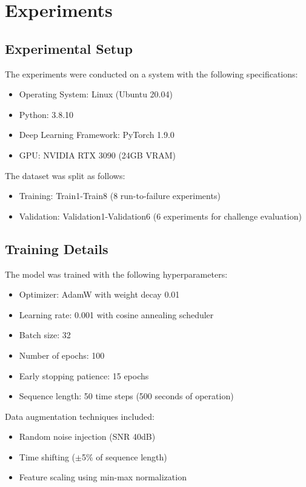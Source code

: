 \documentclass[conference,twocolumn]{IEEEtran}
\begin{document}
\section{Experiments}

\subsection{Experimental Setup}

The experiments were conducted on a system with the following specifications:
\begin{itemize}
    \item Operating System: Linux (Ubuntu 20.04)
    \item Python: 3.8.10
    \item Deep Learning Framework: PyTorch 1.9.0
    \item GPU: NVIDIA RTX 3090 (24GB VRAM)
\end{itemize}

The dataset was split as follows:
\begin{itemize}
    \item Training: Train1-Train8 (8 run-to-failure experiments)
    \item Validation: Validation1-Validation6 (6 experiments for challenge evaluation)
\end{itemize}

\subsection{Training Details}

The model was trained with the following hyperparameters:
\begin{itemize}
    \item Optimizer: AdamW with weight decay 0.01
    \item Learning rate: 0.001 with cosine annealing scheduler
    \item Batch size: 32
    \item Number of epochs: 100
    \item Early stopping patience: 15 epochs
    \item Sequence length: 50 time steps (500 seconds of operation)
\end{itemize}

Data augmentation techniques included:
\begin{itemize}
    \item Random noise injection (SNR 40dB)
    \item Time shifting ($\pm$5\% of sequence length)
    \item Feature scaling using min-max normalization
\end{itemize}
\end{document}
